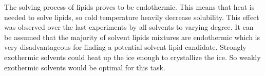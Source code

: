 The solving process of lipids proves to be endothermic. This means that heat is needed to solve lipids, so cold temperature heavily decrease solubility. This effect was observed over the last experiments by all solvents to varying degree. It can be assumed that the majority of solvent lipids mixtures are endothermic which is very disadvantageous for finding a potential solvent lipid candidate. Strongly exothermic solvents could heat up the ice enough to crystallize the ice. So weakly exothermic solvents would be optimal for this task.